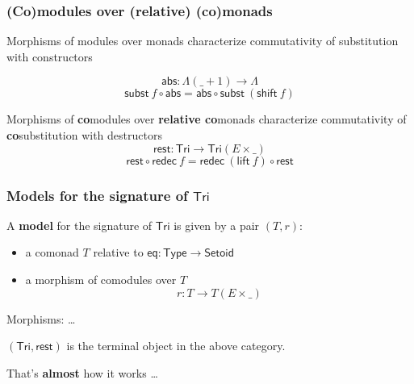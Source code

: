 \documentclass[
]
{beamer}
\newcommand{\constfont}[1]{\ensuremath{\mathsf{#1}}}
\newcommand{\bind}[2]{{#1}\mathbin{\gg\hspace{-.8ex}=}{#2}}
\newcommand{\Tri}{\constfont{Tri}}
\newcommand{\tail}{\constfont{rest}}
\newcommand{\redec}{\constfont{redec}}
\newcommand{\comp}[2]{\ensuremath{{#2} \circ {#1}}}
\newcommand{\shift}{\constfont{shift}}
\newcommand{\lift}{\constfont{lift}}
\newcommand{\subst}{\constfont{subst}}
\newcommand{\Setoid}{\constfont{Setoid}}
\newcommand{\eq}{\ensuremath{\mathsf{eq}}}
\newcommand{\App}{\constfont{app}}
\newcommand{\Abs}{\constfont{abs}}
\newcommand{\LC}{{\Lambda}}
\newcommand{\Set}{\constfont{Type}}
\newcommand{\fat}[1]{\textbf{#1}}
\begin{document}
\begin{frame}
 \frametitle{(Co)modules over (relative) (co)monads}
 \begin{block}{Morphisms of modules over monads}
   characterize commutativity of substitution with constructors

         \[ \Abs : \LC(\_ + 1) \to \LC \]
         \[ \comp{\Abs}{\subst~f} = \comp{\subst~(\shift~f)}{\Abs} \]
 \end{block}

 \begin{block}{Morphisms of \fat{co}modules over \fat{relative co}monads}
   characterize commutativity of \fat{co}substitution with destructors
         \[\tail : \Tri \to \Tri(E\times \_)\]
         \[\comp{\redec~f}{\tail} = \comp{\tail}{\redec~(\lift~f)} \]
 \end{block} 
\end{frame}

\begin{frame}
 \frametitle{Models for the signature of $\Tri$}
  \begin{definition}
    A \fat{model} for the signature of $\Tri$ is given by a pair $(T,r)$:
    \begin{itemize}
     \item a comonad $T$ relative to $\eq: \Set \to \Setoid$
     \item a morphism of comodules over $T$
        \[  r : T \to T(E \times \_) \]
    \end{itemize}
   Morphisms: \ldots
  \end{definition}

 \begin{lemma}[tentative]
  $(\Tri,\tail)$ is the terminal object in the above category.
 \end{lemma}

 That's \fat{almost} how it works \ldots
  
\end{frame}
\end{document}
